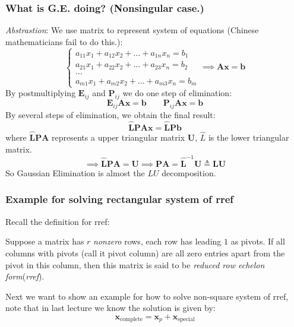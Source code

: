 \subsubsection{What is G.E. doing? (Nonsingular case.)}
\emph{Abstrastion}: We use matrix to represent system of equations (Chinese mathematicians fail to do this.):
\[\begin{cases}
a_{11}x_1 + a_{12}x_2 + \dots + a_{1n}x_n = b_1 \\ 
a_{21}x_1 + a_{22}x_2 + \dots + a_{23}x_n = b_2  \\
\dots 	 	\\
a_{m1}x_1 + a_{m2}x_2 + \dots + a_{m3}x_n = b_m  
\end{cases}
\implies
\bm{Ax} = \bm b\]
By postmultiplying $\bm E_{ij}$ and $\bm P_{ij}$ we do one step of elimination:
\[
\bm E_{ij}\bm A\bm x = \bm b\qquad\bm P_{ij}\bm A\bm x = \bm b
\]
By several steps of elimination, we obtain the final result:
\[
\bm{\hat LPAx} = \bm{\hat LPb}
\]
where $\bm{\hat LPA}$ represents a upper triangular matrix $\bm U$, $\hat L$ is the lower triangular matrix.
\[
\implies \bm{\hat LPA} = \bm U\implies
\bm{PA} = \bm{\hat L}^{-1}\bm U\triangleq\bm{LU}
\]
So Gaussian Elimination is almost the $LU$ decomposition.\\
\subsubsection{Example for solving rectangular system of rref}
Recall the definition for rref:
\begin{definition}
Suppose a matrix has $r$ \textit{nonzero} rows, each row has leading $1$ as pivots. If all columns with pivots (call it pivot column) are all zero entries apart from the pivot in this column, then this matrix is said to be \emph{reduced row echelon form}(\emph{rref}).
\end{definition}
Next we want to show an example for how to solve non-square system of rref, note that in last lecture we know the solution is given by:
\[
\bm x_{\text{complete}} =\bm x_p +\bm x_{\text{special}} 
\]

